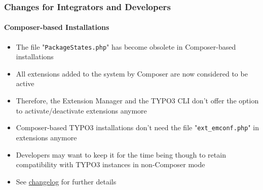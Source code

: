 %

\begin{frame}[fragile]
	\frametitle{Changes for Integrators and Developers}
	\framesubtitle{Composer-based Installations}


	\begin{itemize}
		\item The file "\texttt{PackageStates.php}" has become obsolete in
			Composer-based installations
		\item All extensions added to the system by Composer are now considered
			to be active
		\item Therefore, the Extension Manager and the TYPO3 CLI don't offer the
			option to activate/deactivate extensions anymore
		\item Composer-based TYPO3 installations don't need the file
			"\texttt{ext\_emconf.php}" in extensions anymore
		\item Developers may want to keep it for the time being though to retain
			compatibility with TYPO3 instances in non-Composer mode
		\item See
			\href{https://docs.typo3.org/c/typo3/cms-core/master/en-us/Changelog/11.4/Feature-94996-ConsiderAllComposerInstalledExtensionsAsActive.html}{changelog}
			for further details
	\end{itemize}
\end{frame}

